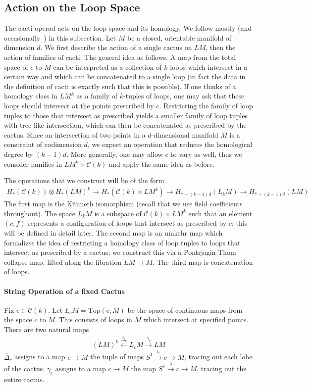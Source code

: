 \documentclass{scrartcl}
\theoremstyle{plain}
\theoremstyle{definition}
\begin{document}
\subsection*{Action on the Loop Space}
The cacti operad acts on the loop space and its homology. We follow mostly \cite{cohen2002homotopy} (and occasionally~\cite{cohen2006string}) in this subsection. Let $M$ be a closed, orientable manifold of dimension $d$. We first describe the action of a single cactus on $LM$, then the action of families of cacti. The general idea as follows. A map from the total space of $c$ to $M$ can be interpreted as a collection of $k$ loops which intersect in a certain way and which can be concatenated to a single loop (in fact the data in the definition of cacti is exactly such that this is possible). If one thinks of a homology class in $LM^k$ as a family of $k$-tuples of loops, one may ask that these loops should intersect at the points prescribed by $c$. Restricting the family of loop tuples to those that intersect as prescribed yields a smaller family of loop tuples with tree-like intersection, which can then be concatenated as prescribed by the cactus. Since an intersection of two points in a $d$-dimensional manifold $M$ is a constraint of codimension $d$, we expect an operation that reduces the homological degree by $(k-1)d$. More generally, one may allow $c$ to vary as well, thus we consider families in $LM^k \times \mathcal C(k)$ and apply the same idea as before. 

The operations that we construct will be of the form
\begin{align*}
    H_*(\mathcal C(k)) \otimes H_*(LM)^k \to H_*(\mathcal C(k) \times LM^k) \to H_{*-(k-1)d}(L_kM) \to H_{*-(k-1)d}(LM)
\end{align*}
The first map is the Künneth isomorphism (recall that we use field coefficients throughout). The space $L_kM$ is a subspace of $\mathcal C(k)\times LM^k$ such that an element $(c, f)$ represents a configuration of loops that intersect as prescribed by $c$; this will be defined in detail later. The second map is an umkehr map which formalizes the idea of restricting a homology class of loop tuples to loops that intersect as prescribed by a cactus; we construct this via a Pontrjagin-Thom collapse map, lifted along the fibration $LM \to M$. The third map is concatenation of loops.

\paragraph{String Operation of a fixed Cactus} Fix $c\in \mathcal C(k)$. Let $L_c M = \mathrm{Top}(c, M)$ be the space of continuous maps from the space $c$ to $M$. This consists of loops in $M$ which intersect at specified points. There are two natural maps 
\begin{align*}
    (LM)^k \xleftarrow{\overline\Delta_c} L_c M \xrightarrow{\gamma_c} LM
\end{align*}
$\overline\Delta_c$ assigns to a map $c\to M$ the tuple of maps $S^1 \xrightarrow{\iota_{i}} c \to M$, tracing out each lobe of the cactus. $\gamma_c$ assigns to a map $c\to M$ the map $S^1\xrightarrow{\lambda} c\to M$, tracing out the entire cactus. 
\end{document}
